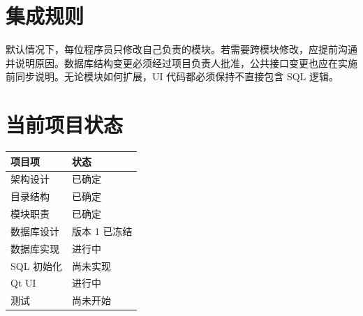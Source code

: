 \documentclass[10pt,twocolumn]{ctexart}
\begin{document}
\section{集成规则}
默认情况下，每位程序员只修改自己负责的模块。若需要跨模块修改，应提前沟通并说明原因。数据库结构变更必须经过项目负责人批准，公共接口变更也应在实施前同步说明。无论模块如何扩展，UI 代码都必须保持不直接包含 SQL 逻辑。

\section{当前项目状态}
\begin{tabular}{>{\raggedright\arraybackslash}p{} >{\raggedright\arraybackslash}p{}}
\toprule
项目项 & 状态 \\
\midrule
架构设计 & 已确定 \\
目录结构 & 已确定 \\
模块职责 & 已确定 \\
数据库设计 & 版本 1 已冻结 \\
数据库实现 & 进行中 \\
SQL 初始化 & 尚未实现 \\
Qt UI & 进行中 \\
测试 & 尚未开始 \\
\bottomrule
\end{tabular}
\end{document}
